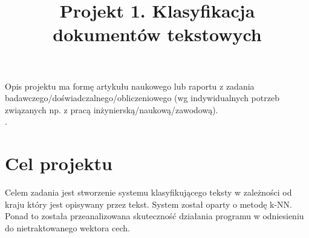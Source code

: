 \documentclass{classrep}
\author{
  \studentinfo{Maciej Lewandowski}{224357} \and
  \studentinfo{Kamil Dike}{224282} }
\title{Projekt 1. Klasyfikacja dokumentów tekstowych}
\begin{document}
\maketitle

Opis projektu ma formę artykułu naukowego lub raportu z zadania
badawczego/doświadczalnego/obliczeniowego (wg indywidualnych potrzeb związanych np. z
pracą inżynierską/naukową/zawodową). \\
. 

\section{Cel projektu}
Celem zadania jest stworzenie systemu klasyfikującego teksty w zależności od kraju który jest opisywany przez tekst.
\indent System został oparty o metodę k-NN. Ponad to została przeanalizowana skuteczność działania programu w odniesieniu do nietraktowanego wektora cech.
\end{document}

